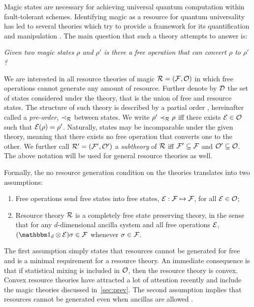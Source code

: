 \documentclass[pra,
aps,
twocolumn,
superscriptaddress,
groupedaddress,
nofootinbib,
reprint
]{revtex4-1}
\begin{document}
Magic states are necessary for achieving universal quantum computation within fault-tolerant schemes.
Identifying magic as a resource for quantum universality has led to several theories which try to provide a framework for its quantification and manipulation .
The main question that such a theory attempts to answer is:
\begin{center}
    \emph{Given two magic states $\rho$ and $\rho'$ is there a free operation that can convert $\rho$ to $\rho'$?}
\end{center}

We are interested in all resource theories of magic $\mathcal{R} = (\mathcal{F}, \mathcal{O})$ in which free operations cannot generate any amount of resource. 
Further denote by $\mathcal{D}$ the set of states considered under the theory, that is the union of free and resource states.
The structure of such theory is described by a partial order , hereinafter called a \emph{pre-order}, $\prec_{\mathcal{R}}$ between states.
We write $\rho' \prec_{\mathcal{R}} \rho$ iff there exists $\mathcal{E} \in \mathcal{O}$ such that $\mathcal{E}(\rho) = \rho'$.
Naturally, states may be incomparable under the given theory, meaning that there exists no free operation that converts one to the other.
We further call $\mathcal{R}' = (\mathcal{F}', \mathcal{O}')$ a \emph{subtheory} of $\mathcal{R}$ iff $\mathcal{F}' \subseteq \mathcal{F}$ and $\mathcal{O}' \subseteq \mathcal{O}$. 
The above notation will be used for general resource theories as well.

Formally, the no resource generation condition on the theories translates into two assumptions:
\begin{enumerate}[I]
    \item Free operations send free states into free states, $\mathcal{E}: \mathcal{F} \mapsto \mathcal{F}$, for all $\mathcal{E} \in \mathcal{O}$;
    \item Resource theory $\mathcal{R}$ is a completely free state preserving theory, in the sense that for any $d$-dimensional ancilla system and all free operations $\mathcal{E}$, $(\id_d \otimes \E ) \sigma \in \F$ whenever $\sigma \in \mathcal{F}$.
\end{enumerate}
The first assumption simply states that resources cannot be generated for free and is a minimal requirement for a resource theory. 
An immediate consequence is that if statistical mixing is included in $\mathcal{O}$, then the resource theory is convex.
Convex resource theories have attracted a lot of attention recently  and include the magic theories discussed in~\cref{sec:prev}.
The second assumption implies that resources cannot be generated even when ancillas are allowed .
\end{document}
